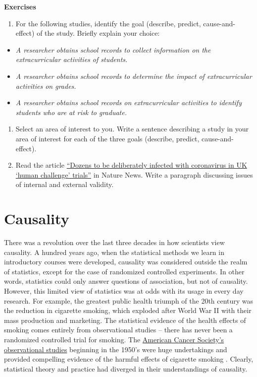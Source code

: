 \documentclass[]{book}
\providecommand{\tightlist}{%
  \setlength{\itemsep}{0pt}\setlength{\parskip}{0pt}}
\begin{document}
\textbf{Exercises}

\begin{enumerate}
\def\labelenumi{\arabic{enumi}.}
\tightlist
\item
  For the following studies, identify the goal (describe, predict, cause-and-effect) of the study. Briefly explain your choice:
\end{enumerate}

\begin{itemize}
\item
  \emph{A researcher obtains school records to collect information on the extracurricular activities of students.}
\item
  \emph{A researcher obtains school records to determine the impact of extracurricular activities on grades.}
\item
  \emph{A researcher obtains school records on extracurricular activities to identify students who are at risk to graduate.}
\end{itemize}

\begin{enumerate}
\def\labelenumi{\arabic{enumi}.}
\setcounter{enumi}{1}
\item
  Select an area of interest to you. Write a sentence describing a study in your area of interest for each of the three goals (describe, predict, cause-and-effect).
\item
  Read the article \href{https://www.nature.com/articles/d41586-020-02821-4}{``Dozens to be deliberately infected with coronavirus in UK `human challenge' trials''} in Nature News. Write a paragraph discussing issues of internal and external validity.
\end{enumerate}

\hypertarget{causality}{%
\chapter{Causality}\label{causality}}

There was a revolution over the last three decades in how scientists view causality. A hundred years ago, when the statistical methods we learn in introductory courses were developed, causality was considered outside the realm of statistics, except for the case of randomized controlled experiments. In other words, statistics could only answer questions of association, but not of causality. However, this limited view of statistics was at odds with its usage in every day research. For example, the greatest public health triumph of the 20th century was the reduction in cigarette smoking, which exploded after World War II with their mass production and marketing. The statistical evidence of the health effects of smoking comes entirely from observational studies -- there has never been a randomized controlled trial for smoking. The \href{https://www.cancer.org/latest-news/the-study-that-helped-spur-the-us-stop-smoking-movement.html}{American Cancer Society's observational studies} beginning in the 1950's were huge undertakings and provided compelling evidence of the harmful effects of cigarette smoking \citep{hammond1954relationship, hammond1966smoking}. Clearly, statistical theory and practice had diverged in their understandings of causality.
\end{document}
